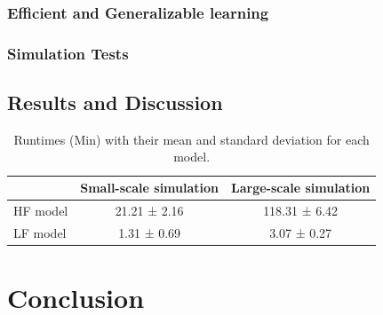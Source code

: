 \documentclass[12pt,a4paper]{report}
\begin{document}
\subsection{Efficient and Generalizable learning}
%


\subsection{Simulation Tests}
%

\section{Results and Discussion}
%
\begin{table}
\caption{Runtimes (Min) with their mean and standard deviation for each model.}\centering
\label{tabel:runtimes_stats}
\begin{tabular}{lcc}
\toprule
 & Small-scale simulation & Large-scale simulation \\
\midrule
HF model & 21.21 ± 2.16 & 118.31 ± 6.42 \\
LF model & 1.31 ± 0.69 & 3.07 ± 0.27 \\
\bottomrule
\end{tabular}
\end{table}

\chapter{Conclusion}





\printbibliography[title={References}, heading=bibintoc]
\end{document}
